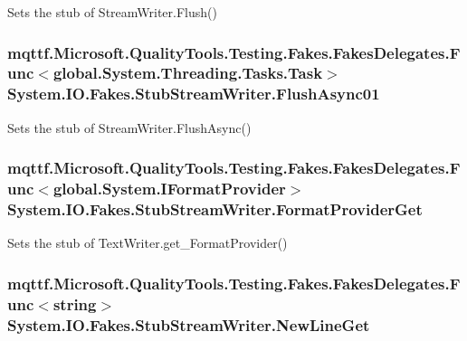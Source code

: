 Sets the stub of Stream\-Writer.\-Flush()

\hypertarget{class_system_1_1_i_o_1_1_fakes_1_1_stub_stream_writer_af01d08c89d0dce9daa4f081ec6442851}{
\subsubsection[{Flush\-Async01}]{\setlength{\rightskip}{0pt plus 5cm}mqttf.\-Microsoft.\-Quality\-Tools.\-Testing.\-Fakes.\-Fakes\-Delegates.\-Func$<$global.\-System.\-Threading.\-Tasks.\-Task$>$ System.\-I\-O.\-Fakes.\-Stub\-Stream\-Writer.\-Flush\-Async01}}\label{class_system_1_1_i_o_1_1_fakes_1_1_stub_stream_writer_af01d08c89d0dce9daa4f081ec6442851}


Sets the stub of Stream\-Writer.\-Flush\-Async()

\hypertarget{class_system_1_1_i_o_1_1_fakes_1_1_stub_stream_writer_adc9b68620d8bebe4d41b02e3f4b0ecd2}{
\subsubsection[{Format\-Provider\-Get}]{\setlength{\rightskip}{0pt plus 5cm}mqttf.\-Microsoft.\-Quality\-Tools.\-Testing.\-Fakes.\-Fakes\-Delegates.\-Func$<$global.\-System.\-I\-Format\-Provider$>$ System.\-I\-O.\-Fakes.\-Stub\-Stream\-Writer.\-Format\-Provider\-Get}}\label{class_system_1_1_i_o_1_1_fakes_1_1_stub_stream_writer_adc9b68620d8bebe4d41b02e3f4b0ecd2}


Sets the stub of Text\-Writer.\-get\-\_\-\-Format\-Provider()

\hypertarget{class_system_1_1_i_o_1_1_fakes_1_1_stub_stream_writer_a787dcb09f699b3cdcdf8a036a4151552}{
\subsubsection[{New\-Line\-Get}]{\setlength{\rightskip}{0pt plus 5cm}mqttf.\-Microsoft.\-Quality\-Tools.\-Testing.\-Fakes.\-Fakes\-Delegates.\-Func$<$string$>$ System.\-I\-O.\-Fakes.\-Stub\-Stream\-Writer.\-New\-Line\-Get}}\label{class_system_1_1_i_o_1_1_fakes_1_1_stub_stream_writer_a787dcb09f699b3cdcdf8a036a4151552}


